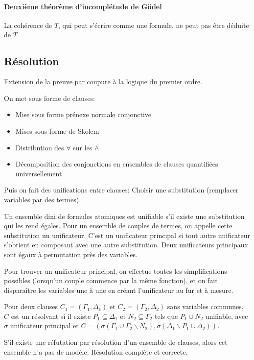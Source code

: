\documentclass[french]{article}
\begin{document}
\paragraph{Deuxième théorème d'incomplétude de Gödel}
La cohérence de $T$, qui peut s'écrire comme une formule, ne peut pas être déduite de $T$.

\subsection{Résolution}
Extension de la preuve par coupure à la logique du premier ordre.

On met sous forme de clauses:
\begin{itemize}
\item Mise sous forme prénexe normale conjonctive
\item Mises sous forme de Skolem
\item Distribution des $\forall$ sur les $\wedge$
\item Décomposition des conjonctions en ensembles de clauses quantifiées universellement
\end{itemize}

Puis on fait des unifications entre clauses:
Choisir une substitution (remplacer variables par des termes).

Un ensemble dini de formules atomiques est unifiable s'il existe une substitution qui les rend égales. Pour un ensemble de couples de termes, on appelle cette substitution un unificateur. C'est un unificateur principal si tout autre unificateur s'obtient en composant avec une autre substitution. Deux unificateurs principaux sont égaux à permutation près des variables.

Pour trouver un unificateur principal, on effectue toutes les simplifications possibles (lorsqu'un couple commence par la même fonction), et on fait disparaître les variables une à une en créant l'unificateur au fur et à mesure.

Pour deux clauses $C_1 = (\Gamma_1, \Delta_1)$ et  $C_2 = (\Gamma_2, \Delta_2)$ sans variables communes, $C$ est un résolvant si il existe $P_1\subseteq\Delta_1$ et $N_2\subseteq\Gamma_2$ tels que $P_1\cup N_2$ unifiable, avec $\sigma$ unificateur principal et $C = (\sigma(\Gamma_1\cup\Gamma_2\backslash N_2), \sigma(\Delta_1\backslash P_1\cup\Delta_2))$.

S'il existe une réfutation par résolution d'un ensemble de clauses, alors cet ensemble n'a pas de modèle. Résolution complète et correcte.
\end{document}
